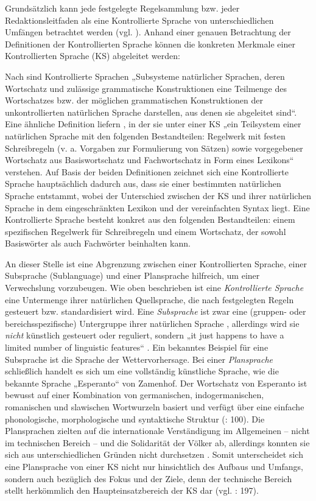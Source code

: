 Grundsätzlich kann jede festgelegte Regelsammlung bzw. jeder Redaktionsleitfaden als eine Kontrollierte Sprache von unterschiedlichen Umfängen betrachtet werden (vgl. \citealt{Göpferich2007a}). Anhand einer genauen Betrachtung der Definitionen der Kontrollierten Sprache können die konkreten Merkmale einer Kontrollierten Sprache (KS) abgeleitet werden:

Nach \citet[366]{Göpferich2008} sind Kontrollierte Sprachen „Subsysteme natürlicher Sprachen, deren Wortschatz und zulässige grammatische Konstruktionen eine Teilmenge des Wortschatzes bzw. der möglichen grammatischen Konstruktionen der unkontrollierten natürlichen Sprache darstellen, aus denen sie abgeleitet sind“. Eine ähnliche Definition liefern \citet[192]{DrewerZiegler2014}, in der sie unter einer KS „ein Teilsystem einer natürlichen Sprache mit den folgenden Bestandteilen: Regelwerk mit festen Schreibregeln (v. a. Vorgaben zur Formulierung von Sätzen) sowie vorgegebener Wortschatz aus Basiswortschatz und Fachwortschatz in Form eines Lexikons“ verstehen. Auf Basis der beiden Definitionen zeichnet sich eine Kontrollierte Sprache hauptsächlich dadurch aus, dass sie einer bestimmten natürlichen Sprache entstammt, wobei der Unterschied zwischen der KS und ihrer natürlichen Sprache in dem eingeschränkten Lexikon und der vereinfachten Syntax liegt. Eine Kontrollierte Sprache besteht konkret aus den folgenden Bestandteilen: einem spezifischen Regelwerk für Schreibregeln und einem Wortschatz, der sowohl Basiswörter als auch Fachwörter beinhalten kann.

An dieser Stelle ist eine Abgrenzung zwischen einer Kontrollierten Sprache, einer Subsprache (Sublanguage) und einer Plansprache hilfreich, um einer Verwechslung vorzubeugen. Wie oben beschrieben ist eine \textit{Kontrollierte Sprache} eine Untermenge ihrer natürlichen Quellsprache, die nach festgelegten Regeln gesteuert bzw. standardisiert wird. Eine \textit{Subsprache} ist zwar eine (gruppen- oder bereichsspezifische) Untergruppe ihrer natürlichen Sprache \citep[33]{Lehrndorfer1996a}, allerdings wird sie \textit{nicht} künstlich gesteuert oder reguliert, sondern „it just happens to have a limited number of linguistic features“ \citep[47]{Roturier2006}. Ein bekanntes Beispiel für eine Subsprache ist die Sprache der Wettervorhersage. Bei einer \textit{Plansprache} schließlich handelt es sich um eine vollständig künstliche Sprache, wie die bekannte Sprache „Esperanto“ von Zamenhof. Der Wortschatz von Esperanto ist bewusst auf einer Kombination von germanischen, indogermanischen, romanischen und slawischen Wortwurzeln basiert und verfügt über eine einfache phonologische, morphologische und syntaktische Struktur (\citealt{LehrndorferReuther2008}: 100). Die Plansprachen zielten auf die internationale Verständigung im Allgemeinen -- nicht im technischen Bereich -- und die Solidarität der Völker ab, allerdings konnten sie sich aus unterschiedlichen Gründen nicht durchsetzen \citep[30]{Lehrndorfer1996a}. Somit unterscheidet sich eine Plansprache von einer KS nicht nur hinsichtlich des Aufbaus und Umfangs, sondern auch bezüglich des Fokus und der Ziele, denn der technische Bereich stellt herkömmlich den Haupteinsatzbereich der KS dar (vgl. \citealt{DrewerZiegler2014}: 197).

